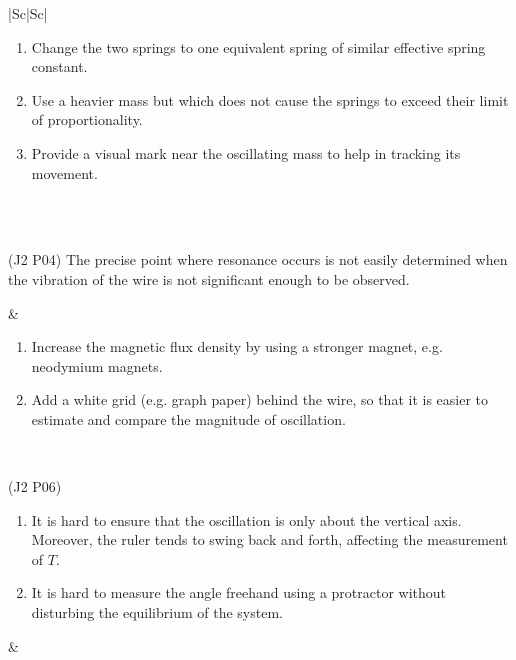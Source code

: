 \documentclass[oneside]{book}
\begin{document}
\begin{itemize}
\begin{longtable}{|Sc|Sc|}
\begin{minipage}{0.5\textwidth-25.2pt}
            \begin{enumerate}[label=\arabic*.]
                \item Change the two springs to one equivalent spring of similar effective spring constant.
                \item Use a heavier mass but which does not cause the springs to exceed their limit of proportionality.
                \item Provide a visual mark near the oscillating mass to help in tracking its movement.
            \end{enumerate} 
        \end{minipage}\\
        \hline
        \hline
        \\
        \hline
        \begin{minipage}{0.5\textwidth-25.2pt}
            (J2 P04) The precise point where resonance occurs is not easily determined when the vibration of the wire is not significant enough to be observed.
        \end{minipage}& 
        \begin{minipage}{0.5\textwidth-25.2pt}
            \begin{enumerate}
                \item Increase the magnetic flux density by using a stronger magnet, e.g. neodymium magnets.
                \item Add a white grid (e.g. graph paper) behind the wire, so that it is easier to estimate and compare the magnitude of oscillation.
            \end{enumerate}
        \end{minipage}\\
        \hline
        \begin{minipage}{0.5\textwidth-25.2pt}
            (J2 P06)
            \begin{enumerate}
                \item It is hard to ensure that the oscillation is only about the vertical axis. Moreover, the ruler tends to swing back and forth, affecting the measurement of \(T\).
                \item It is hard to measure the angle freehand using a protractor without disturbing the equilibrium of the system.
            \end{enumerate}
        \end{minipage}&
        \begin{minipage}{0.5\textwidth-25.2pt}

\end{minipage}
\end{longtable}
\end{itemize}
\end{document}
